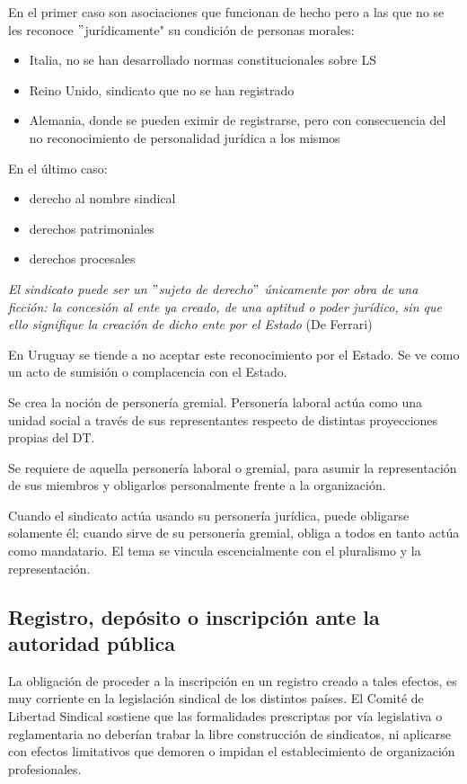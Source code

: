 \documentclass[spanish,12pt,a4paper,titlepage]{report}
\begin{document}
En el primer caso son asociaciones que funcionan de hecho pero a las que no se les reconoce $"$jurídicamente" su condición de personas morales:
\begin{itemize}
\item Italia, no se han desarrollado normas constitucionales sobre LS
\item Reino Unido, sindicato que no se han registrado
\item Alemania, donde se pueden eximir de registrarse, pero con consecuencia del no reconocimiento de personalidad jurídica a los mismos
\end{itemize}
En el último caso:
\begin{itemize}
\item derecho al nombre sindical
\item derechos patrimoniales
\item derechos procesales
\end{itemize}

\textit{El sindicato puede ser un $"$sujeto de derecho$"$ únicamente por obra de una ficción: la concesión al ente ya creado, de una aptitud o poder jurídico, sin que ello signifique la creación de dicho ente por el Estado} (De Ferrari)

En Uruguay se tiende a no aceptar este reconocimiento por el Estado. Se ve como un acto de sumisión o complacencia con el Estado.

Se crea la noción de personería gremial. Personería laboral actúa como una unidad social a través de sus representantes respecto de distintas proyecciones propias del DT.

Se requiere de aquella personería laboral o gremial, para asumir la representación de sus miembros y obligarlos personalmente frente a la organización.

Cuando el sindicato actúa usando su personería jurídica, puede obligarse solamente él; cuando sirve de su personería gremial, obliga a todos en tanto actúa como mandatario. El tema se vincula escencialmente con el pluralismo y la representación. 

\subsection{Registro, depósito o inscripción ante la autoridad pública}
La obligación de proceder a la inscripción en un registro creado a tales efectos, es muy corriente en la legislación sindical de los distintos países. El Comité de Libertad Sindical sostiene que las formalidades prescriptas por vía legislativa o reglamentaria no deberían trabar la libre construcción de sindicatos, ni aplicarse con efectos limitativos que demoren o impidan el establecimiento de organización profesionales.
\end{document}
